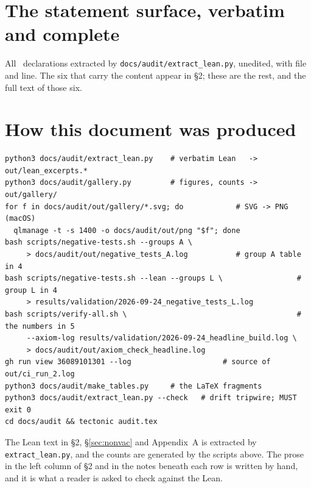\documentclass[11pt]{article}
\newcommand{\code}[1]{\texttt{\small #1}}
\begin{document}
\appendix
\section{The statement surface, verbatim and complete}

All \ndecls\ declarations extracted by \code{docs/audit/extract\_lean.py},
unedited, with file and line. The six that carry the content appear in \S2;
these are the rest, and the full text of those six.



\section{How this document was produced}

\begin{Verbatim}[fontsize=\small]
python3 docs/audit/extract_lean.py    # verbatim Lean   -> out/lean_excerpts.*
python3 docs/audit/gallery.py         # figures, counts -> out/gallery/
for f in docs/audit/out/gallery/*.svg; do            # SVG -> PNG (macOS)
  qlmanage -t -s 1400 -o docs/audit/out/png "$f"; done
bash scripts/negative-tests.sh --groups A \
     > docs/audit/out/negative_tests_A.log           # group A table in 4
bash scripts/negative-tests.sh --lean --groups L \                 # group L in 4
     > results/validation/2026-09-24_negative_tests_L.log
bash scripts/verify-all.sh \                                       # the numbers in 5
     --axiom-log results/validation/2026-09-24_headline_build.log \
     > docs/audit/out/axiom_check_headline.log
gh run view 36089101301 --log                     # source of out/ci_run_2.log
python3 docs/audit/make_tables.py     # the LaTeX fragments
python3 docs/audit/extract_lean.py --check   # drift tripwire; MUST exit 0
cd docs/audit && tectonic audit.tex
\end{Verbatim}

\noindent The Lean text in \S2, \S\ref{sec:nonvac} and Appendix~A is extracted by
\code{extract\_lean.py}, and the counts are generated by the scripts above. The
prose in the left column of \S2 and in the notes beneath each row is written
by hand, and it is what a reader is asked to check against the Lean.
\end{document}
